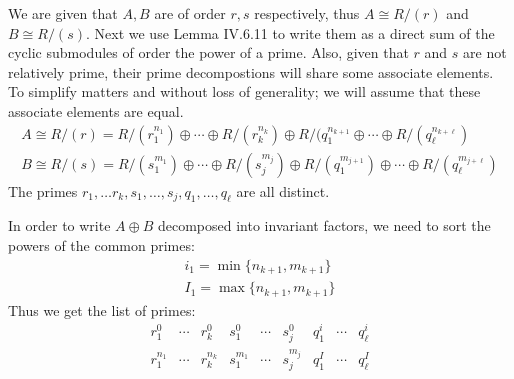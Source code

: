  We are given that $A,B$ are of order $r,s$ respectively, thus  $A \cong R/(r)$ and $B\cong R/(s)$. 
 Next we use Lemma IV.6.11 to write them as a direct sum of the cyclic  submodules of order the power of a prime. 
 Also, given that $r$ and $s$ are not relatively prime, their prime decompostions will share some associate elements. 
 To simplify matters and without loss of generality; we will assume that these associate elements are equal.
\begin{gather*}
    A\cong R/(r) = R/(r_1^{n_1})\oplus \cdots \oplus R/(r_k^{n_k})\oplus R/(q_1^{n_{k+1}}\oplus \cdots \oplus R/(q_\ell^{n_{k+\ell}})\\
    B\cong R/(s) = R/(s_1^{m_1})\oplus \cdots \oplus R/(s_j^{m_{j}})\oplus R/(q_1^{m_{j+1}})\oplus \cdots \oplus R/(q_\ell^{m_{j+\ell}})
\end{gather*}
The primes $r_1,\ldots r_k,s_1,\ldots,s_j,q_1,\ldots,q_\ell$ are all distinct. 

In order to write $A\oplus B$ decomposed into invariant factors, we need to sort the powers of the common primes: 
\begin{gather*}
    i_1= \min\{ n_{k+1},m_{k+1}\}\\
    I_1= \max\{ n_{k+1},m_{k+1}\}
\end{gather*}
Thus we get the list of primes:
\begin{equation*}
 \begin{matrix}
     r_1^{0}   & \cdots & r_k^{0}   & s_1^{0}   & \cdots & s_j^{0} & q_1^i & \cdots    & q_\ell^i \\
     r_1^{n_1} & \cdots & r_k^{n_k} & s_1^{m_1} & \cdots & s_j^{m_{j}}  & q_1^I & \cdots & q_\ell^I 
\end{matrix} 
\end{equation*}

